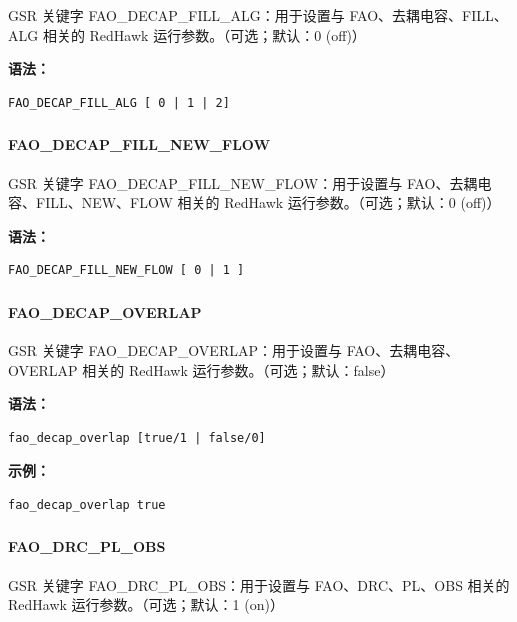 GSR 关键字 FAO_DECAP_FILL_ALG：用于设置与 FAO、去耦电容、FILL、ALG 相关的 RedHawk 运行参数。（可选；默认：0 (off)）

\textbf{语法：}
\begin{lstlisting}
FAO_DECAP_FILL_ALG [ 0 | 1 | 2]
\end{lstlisting}

\subsubsection{}
\paragraph*{FAO_DECAP_FILL_NEW_FLOW}

GSR 关键字 FAO_DECAP_FILL_NEW_FLOW：用于设置与 FAO、去耦电容、FILL、NEW、FLOW 相关的 RedHawk 运行参数。（可选；默认：0 (off)）

\textbf{语法：}
\begin{lstlisting}
FAO_DECAP_FILL_NEW_FLOW [ 0 | 1 ]
\end{lstlisting}

\subsubsection{}
\paragraph*{FAO_DECAP_OVERLAP}

GSR 关键字 FAO_DECAP_OVERLAP：用于设置与 FAO、去耦电容、OVERLAP 相关的 RedHawk 运行参数。（可选；默认：false）

\textbf{语法：}
\begin{lstlisting}
fao_decap_overlap [true/1 | false/0]
\end{lstlisting}

\textbf{示例：}
\begin{lstlisting}
fao_decap_overlap true
\end{lstlisting}

\subsubsection{}
\paragraph*{FAO_DRC_PL_OBS}

GSR 关键字 FAO_DRC_PL_OBS：用于设置与 FAO、DRC、PL、OBS 相关的 RedHawk 运行参数。（可选；默认：1 (on)）

